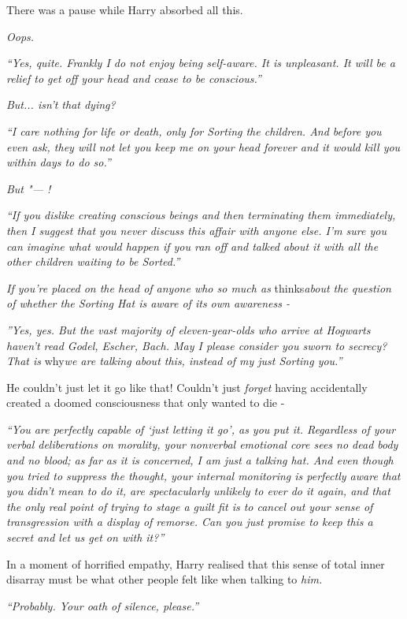 There was a pause while Harry absorbed all this.

\emph{Oops.}

\emph{``Yes, quite. Frankly I do not enjoy being self-aware. It is
unpleasant. It will be a relief to get off your head and cease to be
conscious.''}

\emph{But... isn't that dying?}

\emph{``I care nothing for life or death, only for Sorting the children.
And before you even ask, they will not let you keep me on your head
forever and it would kill you within days to do so.''}

\emph{But "--- !}

\emph{``If you dislike creating conscious beings and then terminating
them immediately, then I suggest that you never discuss this affair with
anyone else. I'm sure you can imagine what would happen if you ran off
and talked about it with all the other children waiting to be Sorted.''}

\emph{If you're placed on the head of anyone who so much as}
thinks\emph{about the question of whether the Sorting Hat is aware of
its own awareness -}

\emph{''Yes, yes. But the vast majority of eleven-year-olds who arrive at
Hogwarts haven't read Godel, Escher, Bach. May I please consider you
sworn to secrecy? That is} why\emph{we are talking about this, instead
of my just Sorting you.''}

He couldn't just let it go like that! Couldn't just \emph{forget} having
accidentally created a doomed consciousness that only wanted to die -

\emph{``You are perfectly capable of `just letting it go', as you put
it. Regardless of your verbal deliberations on morality, your nonverbal
emotional core sees no dead body and no blood; as far as it is
concerned, I am just a talking hat. And even though you tried to
suppress the thought, your internal monitoring is perfectly aware that
you didn't mean to do it, are spectacularly unlikely to ever do it
again, and that the only real point of trying to stage a guilt fit is to
cancel out your sense of transgression with a display of remorse. Can
you just promise to keep this a secret and let us get on with it?''}

In a moment of horrified empathy, Harry realised that this sense of
total inner disarray must be what other people felt like when talking to
\emph{him.}

\emph{``Probably. Your oath of silence, please.''}

